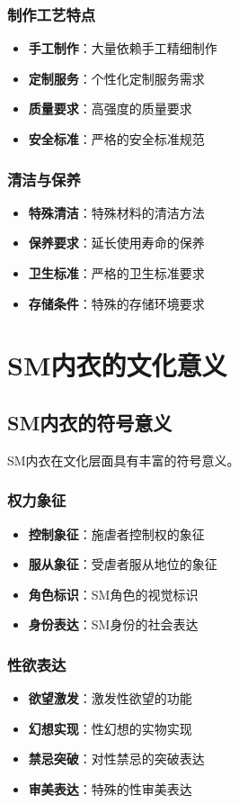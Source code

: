 \documentclass[12pt,UTF8]{ctexbook}
\begin{document}
\subsection{制作工艺特点}
\begin{itemize}[leftmargin=2cm]
	\item \textbf{手工制作}：大量依赖手工精细制作
	\item \textbf{定制服务}：个性化定制服务需求
	\item \textbf{质量要求}：高强度的质量要求
	\item \textbf{安全标准}：严格的安全标准规范
\end{itemize}

\subsection{清洁与保养}
\begin{itemize}[leftmargin=2cm]
	\item \textbf{特殊清洁}：特殊材料的清洁方法
	\item \textbf{保养要求}：延长使用寿命的保养
	\item \textbf{卫生标准}：严格的卫生标准要求
	\item \textbf{存储条件}：特殊的存储环境要求
\end{itemize}

\chapter{SM内衣的文化意义}
\section{SM内衣的符号意义}
SM内衣在文化层面具有丰富的符号意义。

\subsection{权力象征}
\begin{itemize}[leftmargin=2cm]
	\item \textbf{控制象征}：施虐者控制权的象征
	\item \textbf{服从象征}：受虐者服从地位的象征
	\item \textbf{角色标识}：SM角色的视觉标识
	\item \textbf{身份表达}：SM身份的社会表达
\end{itemize}

\subsection{性欲表达}
\begin{itemize}[leftmargin=2cm]
	\item \textbf{欲望激发}：激发性欲望的功能
	\item \textbf{幻想实现}：性幻想的实物实现
	\item \textbf{禁忌突破}：对性禁忌的突破表达
	\item \textbf{审美表达}：特殊的性审美表达
\end{itemize}
\end{document}
